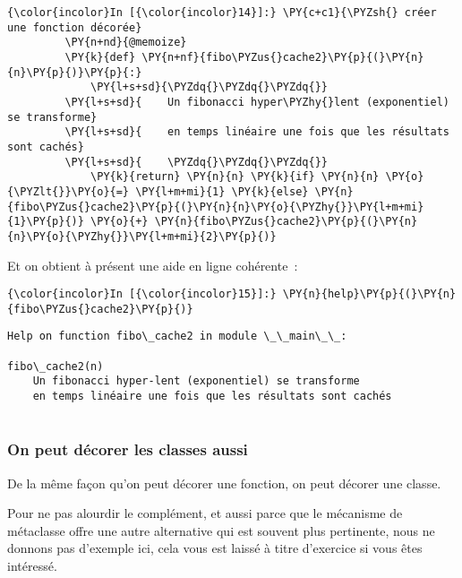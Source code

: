     \begin{Verbatim}[commandchars=\\\{\}]
{\color{incolor}In [{\color{incolor}14}]:} \PY{c+c1}{\PYZsh{} créer une fonction décorée}
         \PY{n+nd}{@memoize}
         \PY{k}{def} \PY{n+nf}{fibo\PYZus{}cache2}\PY{p}{(}\PY{n}{n}\PY{p}{)}\PY{p}{:}
             \PY{l+s+sd}{\PYZdq{}\PYZdq{}\PYZdq{}}
         \PY{l+s+sd}{    Un fibonacci hyper\PYZhy{}lent (exponentiel) se transforme}
         \PY{l+s+sd}{    en temps linéaire une fois que les résultats sont cachés}
         \PY{l+s+sd}{    \PYZdq{}\PYZdq{}\PYZdq{}}
             \PY{k}{return} \PY{n}{n} \PY{k}{if} \PY{n}{n} \PY{o}{\PYZlt{}}\PY{o}{=} \PY{l+m+mi}{1} \PY{k}{else} \PY{n}{fibo\PYZus{}cache2}\PY{p}{(}\PY{n}{n}\PY{o}{\PYZhy{}}\PY{l+m+mi}{1}\PY{p}{)} \PY{o}{+} \PY{n}{fibo\PYZus{}cache2}\PY{p}{(}\PY{n}{n}\PY{o}{\PYZhy{}}\PY{l+m+mi}{2}\PY{p}{)}
\end{Verbatim}


    Et on obtient à présent une aide en ligne cohérente~:

    \begin{Verbatim}[commandchars=\\\{\}]
{\color{incolor}In [{\color{incolor}15}]:} \PY{n}{help}\PY{p}{(}\PY{n}{fibo\PYZus{}cache2}\PY{p}{)}
\end{Verbatim}


    \begin{Verbatim}[commandchars=\\\{\}]
Help on function fibo\_cache2 in module \_\_main\_\_:

fibo\_cache2(n)
    Un fibonacci hyper-lent (exponentiel) se transforme
    en temps linéaire une fois que les résultats sont cachés


    \end{Verbatim}

    \hypertarget{on-peut-duxe9corer-les-classes-aussi}{%
\subsubsection{On peut décorer les classes
aussi}\label{on-peut-duxe9corer-les-classes-aussi}}

    De la même façon qu'on peut décorer une fonction, on peut décorer une
classe.

Pour ne pas alourdir le complément, et aussi parce que le mécanisme de
métaclasse offre une autre alternative qui est souvent plus pertinente,
nous ne donnons pas d'exemple ici, cela vous est laissé à titre
d'exercice si vous êtes intéressé.

